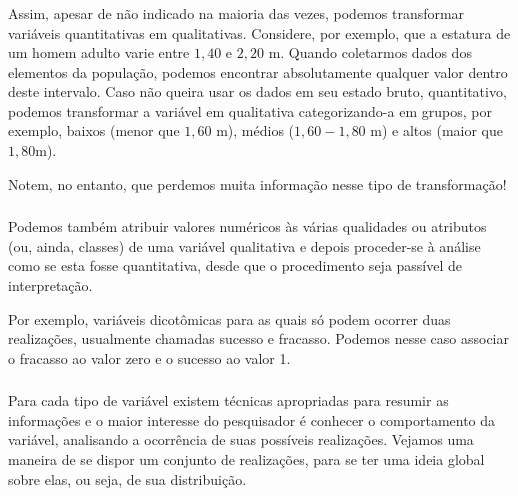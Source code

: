 \documentclass[12pt]{beamer}
\begin{document}
\begin{frame}{}
\frametitle{}
\begin{block}{}
\justifying
Assim, apesar de não indicado na maioria das vezes, podemos transformar variáveis quantitativas em qualitativas. Considere, por exemplo, que a estatura de um homem adulto varie entre $1,40$ e $2,20$ m. Quando coletarmos dados dos elementos da população, podemos encontrar absolutamente qualquer valor dentro deste intervalo. Caso não queira usar os dados em seu estado bruto, quantitativo, podemos transformar a variável em qualitativa categorizando-a em grupos, por exemplo, baixos (menor que $1,60$ m), médios ($1,60-1,80$ m) e altos (maior que $1,80$m). 
\end{block}
\pause
\begin{block}{}
Notem, no entanto, que perdemos muita informação nesse tipo de transformação!
\end{block}
\end{frame}

\begin{frame}{}
\frametitle{}
\begin{block}{}
\justifying
Podemos também atribuir valores numéricos às várias qualidades ou atributos (ou, ainda, classes) de uma variável qualitativa e depois proceder-se à análise como se esta fosse quantitativa, desde que o procedimento seja passível de interpretação. 
\end{block}
\pause
\begin{block}{}
	\justifying
Por exemplo, variáveis dicotômicas para as quais só podem ocorrer duas realizações, usualmente chamadas sucesso e fracasso. Podemos nesse caso associar o fracasso ao valor zero e o sucesso ao valor 1.
\end{block}
\end{frame}

\begin{frame}{}
\frametitle{}
\begin{block}{}
\justifying
Para cada tipo de variável existem técnicas apropriadas para resumir as informações e o maior interesse do pesquisador é conhecer o comportamento da variável, analisando a ocorrência de suas possíveis realizações. Vejamos uma maneira de se dispor um conjunto de realizações, para se ter uma ideia global sobre elas, ou seja, de sua distribuição. 
\end{block}

\end{frame}
\end{document}

